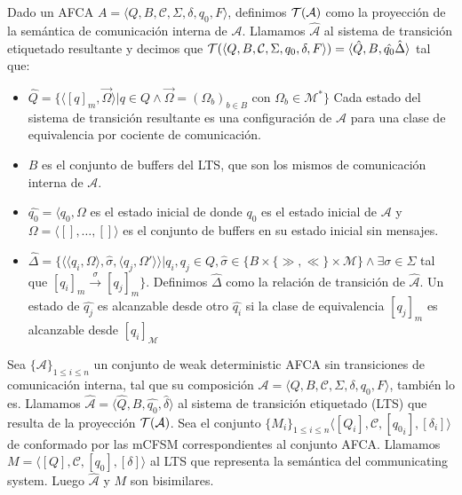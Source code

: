 \begin{definition}\label{def:pci}
Dado un AFCA $A = \langle Q, B, \mathcal{C}, \Sigma, \delta, q_0, F \rangle$, definimos $\mathcal{T}(\mathcal{A})$ como la proyección de la semántica de comunicación interna de $\mathcal{A}$. Llamamos $\hat{\mathcal{A}}$ al sistema de transición etiquetado resultante y decimos que $\mathcal{T} (\langle Q, B, \mathcal{C}, \Sigma, q_0, \delta, F \rangle)= \langle \hat{Q}, B, \hat{q_0} \hat{\Delta} \rangle$ tal que:
\begin{itemize}
    \item $ \hat{Q} = \{ \langle [q]_m, \overrightarrow{\Omega} \rangle | q \in Q \land \overrightarrow{\Omega} = (\Omega_b)_{b \in B}$ con $\Omega_b \in \mathcal{M}^* \}$ Cada estado del sistema de transición resultante es una configuración de $\mathcal{A}$ para una clase de equivalencia por cociente de comunicación.
    
    \item $B$ es el conjunto de buffers del LTS, que son los mismos de comunicación interna de $\mathcal{A}$.
    
    \item $\hat{q_0}= \langle q_0, \Omega$ es el estado inicial de  donde $q_0$ es el estado inicial de $\mathcal{A}$ y $\Omega = \langle [], \ldots, [] \rangle$ es el conjunto de buffers en su estado inicial sin mensajes.
    
    \item $\hat{\Delta}= \{\langle \langle q_i, \Omega \rangle, \hat{\sigma},\langle q_j, \Omega' \rangle \rangle | q_i,q_j \in Q, \hat{\sigma} \in \{B \times \{\gg, \ll\} \times \mathcal{M}\} \land \exists \sigma \in \Sigma$ tal que  $[q_i]_m \xrightarrow{\sigma} [q_j]_m \}$. Definimos $\hat{\Delta}$ como la relación de transición de $\hat{\mathcal{A}}$. Un estado de $\hat{q_j}$ es alcanzable desde otro $\hat{q_i}$ si la clase de equivalencia $[q_j]_m$ es alcanzable desde $[q_i]_\mathcal{M}$
    
\end{itemize}
\end{definition}

\begin{theorem} Sea $\{\mathcal{A}\}_{1 \leq i \leq n}$ un conjunto de weak deterministic AFCA sin transiciones de comunicación interna, tal que su composición $\mathcal{A} = \langle Q, B, \mathcal{C},\Sigma, \delta, q_0, F \rangle$, también lo es. Llamamos $\hat{\mathcal{A}}=\langle \hat{Q}, B, \hat{q_0}, \hat{\delta} \rangle$ al sistema de transición etiquetado (LTS) que resulta de la proyección $\mathcal{T}(\mathcal{A})$. Sea el conjunto $\{M_i\}_{1 \leq i \leq n} \langle [Q_i], \mathcal{C}, [{q_0}_i], [\delta_i] \rangle$ de conformado por las mCFSM correspondientes al conjunto AFCA. Llamamos $M = \langle [Q], \mathcal{C}, [{q_0}], [\delta] \rangle$ al LTS que representa la semántica del communicating system. Luego $\hat{\mathcal{A}}$ y $M$ son bisimilares. 
\end{theorem}

